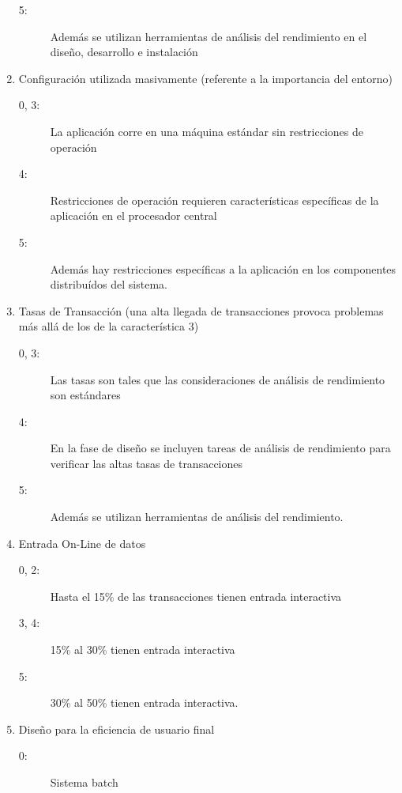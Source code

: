 \begin{enumerate}
\begin{description}
                    \item[5:]Además se utilizan herramientas de análisis del rendimiento en el diseño, desarrollo e instalación
                \end{description}
            \item Configuración utilizada masivamente (referente a la importancia del entorno)
                \begin{description}
                    \item[0, 3:]La aplicación corre en una máquina estándar sin restricciones de operación
                    \item[4:]Restricciones de operación requieren características específicas de la aplicación en el procesador central
                    \item[5:]Además hay restricciones específicas a la aplicación en los componentes distribuídos del sistema.
                \end{description}
            \item Tasas de Transacción (una alta llegada de transacciones provoca problemas más allá de los de la característica 3)
                \begin{description}
                    \item[0, 3:]Las tasas son tales que las consideraciones de análisis de rendimiento son estándares
                    \item[4:]En la fase de diseño se incluyen tareas de análisis de rendimiento para verificar las altas tasas de transacciones
                    \item[5:]Además se utilizan herramientas de análisis del rendimiento.
                \end{description}
            \item Entrada On-Line de datos
                \begin{description}
                    \item[0, 2:]Hasta el 15\% de las transacciones tienen entrada interactiva
                    \item[3, 4:]15\% al 30\% tienen entrada interactiva
                    \item[5:]30\% al 50\% tienen entrada interactiva.
                \end{description}
            \item Diseño para la eficiencia de usuario final
                \begin{description}
                    \item[0:]Sistema batch

\end{description}
\end{enumerate}
